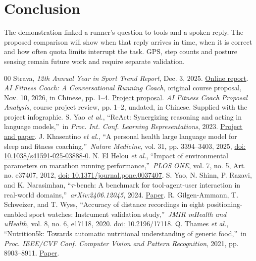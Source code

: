 \documentclass[conference]{IEEEtran}
\begin{document}
\section{Conclusion}
The demonstration linked a runner's question to tools and a spoken reply. The proposed comparison will show when that reply arrives in time, when it is correct and how often quota limits interrupt the task. GPS, step counts and posture sensing remain future work and require separate validation.

\begin{thebibliography}{00}
 Strava, \emph{12th Annual Year in Sport Trend Report}, Dec. 3, 2025. \href{https://press.strava.com/en-gb/articles/strava-releases-12th-annual-year-in-sport-trend-report-2025}{Online report}.
 \emph{AI Fitness Coach: A Conversational Running Coach}, original course proposal, Nov. 10, 2026, in Chinese, pp. 1--4. \href{https://github.com/HitomiHuang/DIC3-AI-Fitness-Coach/blob/main/myplan/proposal.pdf}{Project proposal}.
 \emph{AI Fitness Coach Proposal Analysis}, course project review, pp. 1--2, undated, in Chinese. Supplied with the project infographic.
 S. Yao \emph{et al.}, \textquotedblleft ReAct: Synergizing reasoning and acting in language models,\textquotedblright\ in \emph{Proc. Int. Conf. Learning Representations}, 2023. \href{https://react-lm.github.io/}{Project and paper}.
 J. Khasentino \emph{et al.}, \textquotedblleft A personal health large language model for sleep and fitness coaching,\textquotedblright\ \emph{Nature Medicine}, vol. 31, pp. 3394--3403, 2025, \href{https://doi.org/10.1038/s41591-025-03888-0}{doi: 10.1038/s41591-025-03888-0}.
 N. El Helou \emph{et al.}, \textquotedblleft Impact of environmental parameters on marathon running performance,\textquotedblright\ \emph{PLOS ONE}, vol. 7, no. 5, Art. no. e37407, 2012, \href{https://doi.org/10.1371/journal.pone.0037407}{doi: 10.1371/journal.pone.0037407}.
 S. Yao, N. Shinn, P. Razavi, and K. Narasimhan, \textquotedblleft $\tau$-bench: A benchmark for tool-agent-user interaction in real-world domains,\textquotedblright\ \emph{arXiv:2406.12045}, 2024. \href{https://arxiv.org/abs/2406.12045}{Paper}.
 R. Gilgen-Ammann, T. Schweizer, and T. Wyss, \textquotedblleft Accuracy of distance recordings in eight positioning-enabled sport watches: Instrument validation study,\textquotedblright\ \emph{JMIR mHealth and uHealth}, vol. 8, no. 6, e17118, 2020. \href{https://doi.org/10.2196/17118}{doi: 10.2196/17118}.
 Q. Thames \emph{et al.}, \textquotedblleft Nutrition5k: Towards automatic nutritional understanding of generic food,\textquotedblright\ in \emph{Proc. IEEE/CVF Conf. Computer Vision and Pattern Recognition}, 2021, pp. 8903--8911. \href{https://openaccess.thecvf.com/content/CVPR2021/html/Thames_Nutrition5k_Towards_Automatic_Nutritional_Understanding_of_Generic_Food_CVPR_2021_paper.html}{Paper}.

\end{thebibliography}
\end{document}
